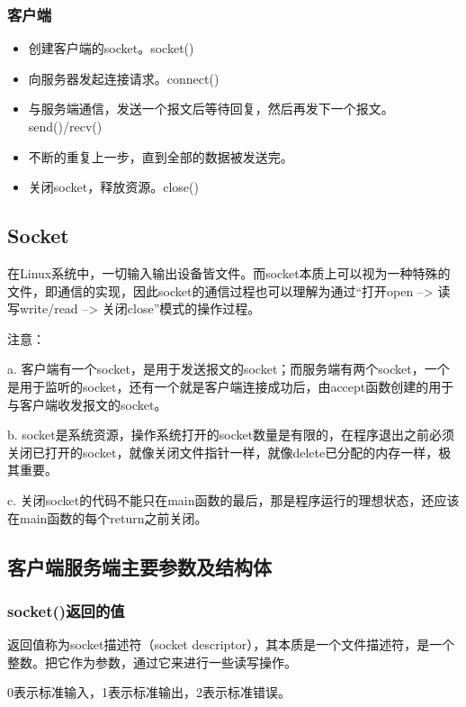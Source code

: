 \documentclass[UTF8]{article}%
\begin{document}
\subsubsection{客户端}

\begin{itemize}
    \item 创建客户端的socket。socket()
    \item 向服务器发起连接请求。connect()
    \item 与服务端通信，发送一个报文后等待回复，然后再发下一个报文。send()/recv()
    \item 不断的重复上一步，直到全部的数据被发送完。
    \item 关闭socket，释放资源。close()
\end{itemize}

\subsection{Socket}

在Linux系统中，一切输入输出设备皆文件。而socket本质上可以视为一种特殊的文件，即通信的实现，因此socket的通信过程也可以理解为通过“打开open –> 读写write/read –> 关闭close”模式的操作过程。

注意：

a. 客户端有一个socket，是用于发送报文的socket；而服务端有两个socket，一个是用于监听的socket，还有一个就是客户端连接成功后，由accept函数创建的用于与客户端收发报文的socket。

b. socket是系统资源，操作系统打开的socket数量是有限的，在程序退出之前必须关闭已打开的socket，就像关闭文件指针一样，就像delete已分配的内存一样，极其重要。

c. 关闭socket的代码不能只在main函数的最后，那是程序运行的理想状态，还应该在main函数的每个return之前关闭。

\subsection{客户端服务端主要参数及结构体}

\subsubsection{socket()返回的值}

返回值称为socket描述符（socket descriptor），其本质是一个文件描述符，是一个整数。把它作为参数，通过它来进行一些读写操作。

0表示标准输入，1表示标准输出，2表示标准错误。
\end{document}
